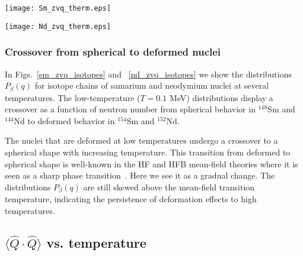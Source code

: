 \documentclass[prc,twocolumn,aps,showpacs,floatfix,nofootinbib,letterpaper,preprintnumbers]{revtex4-1}
\begin{document}
\begin{figure*}[htb]
  \texttt{[image: Sm\_zvq\_therm.eps]}
    \caption{Distributions $P(q)$ vs.~$q$ for an isotope chain of even-mass samarium nuclei at high temperature (top row), intermediate temperatures (middle row), and at low temperature (bottom row). In the middle row, the deformed nuclei ($^{150}\text{Sm}$, $^{152}\text{Sm}$, $^{154}\text{Sm}$) are shown near their HFB shape transition temperatures. The solid lines are the rigid-rotor distributions (\ref{prob-rotor}) with the ground-state HFB values of  the intrinsic quadrupole moment $q_0$.}
    \label{sm_zvq_isotopes}
\end{figure*} 
%
\begin{figure*}[htb]
  \texttt{[image: Nd\_zvq\_therm.eps]}
    \caption{As in Fig.~\ref{sm_zvq_isotopes} but for an isotope chain of even-mass neodymium nuclei. In the middle row, the deformed nuclei ($^{148}\text{Nd}$, $^{150}\text{Nd}$, $^{152}\text{Nd}$) are shown near their HFB shape transition temperatures.}
    \label{nd_zvq_isotopes}
\end{figure*}

\subsubsection{Crossover from spherical to deformed nuclei}

In Figs.~\ref{sm_zvq_isotopes} and ~\ref{nd_zvq_isotopes} we show the distributions $P_\beta(q)$ for isotope chains of samarium and neodymium nuclei at several temperatures. The low-temperature ($T=0.1$ MeV) distributions display a crossover as a function of neutron number from spherical behavior in $^{148}$Sm and $^{144}$Nd to deformed behavior in $^{154}$Sm and $^{152}$Nd.

The nuclei that are deformed at low temperatures undergo a crossover to a spherical shape with increasing temperature. This transition from deformed to spherical shape is well-known in the HF and HFB mean-field theories where it is seen as a sharp phase transition~\cite{go86,ma03,ag00}. Here we see it as a gradual change. The distributions $P_\beta(q)$ are still skewed above the mean-field transition temperature, indicating the persistence of deformation effects to high temperatures. 

\subsection{ $\langle \hat Q \cdot \hat Q\rangle$ vs. temperature}
\end{document}
